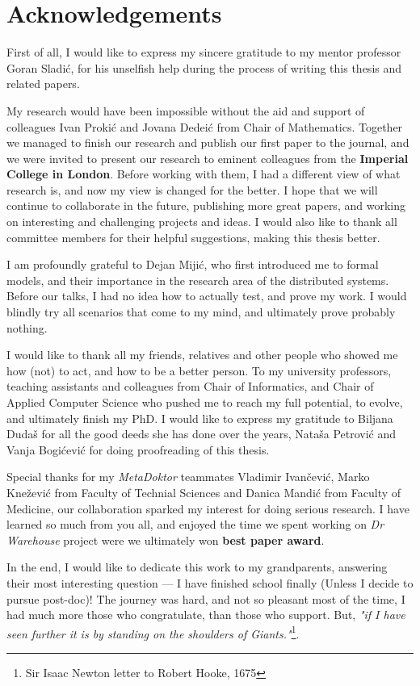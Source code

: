 \chapter*{Acknowledgements}
First of all, I would like to express my sincere gratitude to my mentor professor Goran Sladi\'c, for his unselfish help during the process of writing this thesis and related papers.

My research would have been impossible without the aid and support of colleagues Ivan Proki\'c and Jovana Dedei\'c from Chair of Mathematics. Together we managed to finish our research and publish our first paper to the journal, and we were invited to present our research to eminent colleagues from the \textbf{Imperial College in London}. Before working with them, I had a different view of what research is, and now my view is changed for the better. I hope that we will continue to collaborate in the future, publishing more great papers, and working on interesting and challenging projects and ideas. I would also like to thank all committee members for their helpful suggestions, making this thesis better.

I am profoundly grateful to Dejan Miji\'c, who first introduced me to formal models, and their importance in the research area of the distributed systems. Before our talks, I had no idea how to actually test, and prove my work. I would blindly try all scenarios that come to my mind, and ultimately prove probably nothing.

I would like to thank all my friends, relatives and other people who showed me how (not) to act, and how to be a better person. To my university professors, teaching assistants and colleagues from Chair of Informatics, and Chair of Applied Computer Science who pushed me to reach my full potential, to evolve, and ultimately finish my PhD. I would like to express my gratitude to Biljana Duda\v s for all the good deeds she has done over the years, Nata\v sa Petrovi\'c and Vanja Bogi\'cevi\'c for doing proofreading of this thesis. 

Special thanks for my \emph{MetaDoktor} teammates Vladimir Ivan\v cevi\'c, Marko Kne\v zevi\'c from Faculty of Technial Sciences and Danica Mandi\'c from Faculty of Medicine, our collaboration sparked my interest for doing serious research. I have learned so much from you all, and enjoyed the time we spent working on \emph{Dr Warehouse} project were we ultimately won \textbf{best paper award}.

In the end, I would like to dedicate this work to my grandparents, answering their most interesting question --- I have finished school finally (Unless I decide to pursue post-doc)! The journey was hard, and not so pleasant most of the time, I had much more those who congratulate, than those who support. But, \emph{"if I have seen further it is by standing on the shoulders of Giants."}\footnote{Sir Isaac Newton letter to Robert Hooke, 1675}.